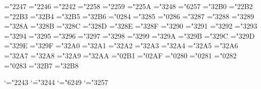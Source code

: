 
\mathchardef\triangleleft="2247
\mathchardef\triangleright="2246
\mathchardef\comp="2242
\mathchardef\setdif="2258
\mathchardef\cupprod="2259
\mathchardef\capprod="225A
\mathchardef\Relbar="3248
\mathchardef\colon="6257
\mathchardef\simarrow="32B0
\mathchardef\varland="22B2
\mathchardef\contraction="22B3
\mathchardef\coloneq="32B4
\mathchardef\eqcolon="32B5
\mathchardef\hateq="32B6
\mathchardef\hbar="0284
\mathchardef\notin="3285
\mathchardef\angle="0286
\mathchardef\doteq="3287
\mathchardef\models="3288
\mathchardef\bowtie="3289
\mathchardef\cong="328A
\mathchardef\hookleftarrow="328B
\mathchardef\hookrightarrow="328C
\mathchardef\longleftarrow="328D
\mathchardef\longrightarrow="328E
\mathchardef\Longleftarrow="328F
\mathchardef\Longrightarrow="3290
\mathchardef\mapsto="3291
\mathchardef\longmapsto="3292
\mathchardef\longleftrightarrow="3293
\mathchardef\Longleftrightarrow="3294
\mathchardef\rightleftharpoons="3295
\mathchardef\notless="3296 \let\nless=\notless
\mathchardef\notleq="3297 \let\nleq=\notleq
\mathchardef\notprec="3298 \let\nprec=\notprec
\mathchardef\notpreceq="3299 \let\npreceq=\notpreceq
\mathchardef\notsubset="329A \let\nsubset=\notsubset
\mathchardef\notsubseteq="329B \let\nsubseteq=\notsubseteq
\mathchardef\notsqsubseteq="329C \let\nsqsubseteq=\notsqsubseteq
\mathchardef\notgr="329D \let\ngtr=\notgr
\mathchardef\notgeq="329E \let\ngeq=\notgeq
\mathchardef\notsucc="329F \let\nsucc=\notsucc
\mathchardef\notsucceq="32A0 \let\nsucceq=\notsucceq
\mathchardef\notsupset="32A1 \let\nsupset=\notsupset
\mathchardef\notsupseteq="32A2 \let\nsupseteq=\notsupseteq
\mathchardef\notsqsupseteq="32A3 \let\nsqsupseteq=\notsqsupseteq
\mathchardef\neq="32A4 \let\ne=\neq
\mathchardef\notequiv="32A5
\mathchardef\notsim="32A6
\mathchardef\notsimeq="32A7
\mathchardef\notapprox="32A8
\mathchardef\notcong="32A9
\mathchardef\notasymp="32AA
\mathchardef\digamma="02B1 
\mathchardef\hslash="02AF
\mathchardef\openclubsuit="0280
\mathchardef\shadedclubsuit="0281
\mathchardef\openspadesuit="0282
\mathchardef\shadedspadesuit="0283
\mathchardef\circdashbullet="32B7
\mathchardef\bulletdashcirc="32B8

\mathcode`\+="2243
\mathcode`\=="3244
\mathcode`\;="6249
\mathcode`\:="3257

\def\dotup{\mathaccent"0254 }
\def\ddotup{\mathaccent"0255 }
\def\oacc{\mathaccent"0256 } \let\mathring=\oacc
\def\wbar{\mathaccent"0278 }
\def\wwbar{\mathaccent"0253 }
\def\what{\mathaccent"0279 }
\def\wtilde{\mathaccent"027A }
\def\wcheck{\mathaccent"027B }
\def\vec{\mathaccent"0245 }
\def\t#1#2{{\edef\next@{\the\font}\the\textfont\tw@\accent"41 \next@#1#2}}

